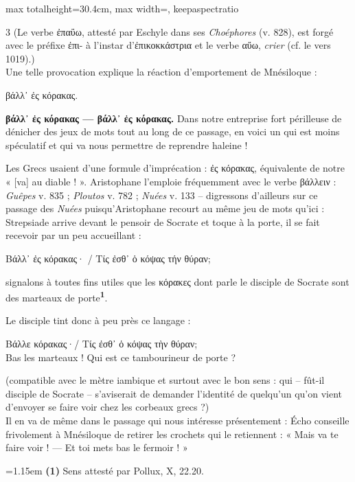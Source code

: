 \documentclass[11pt,twoside]{book}
\newcommand{\italique}[1]{\textit{#1}}
\newcommand{\citComm}[1]{\begin{quoting}[vskip=0.4pt,leftmargin=0.7em,rightmargin=0.2em]#1\end{quoting}}
\newcommand{\marqueur}[1]{\textsuperscript{\color{rubricRed}\textbf{#1}}}
\begin{document}
\begin{adjustbox}{max totalheight=30.4cm, max width=\textwidth, keepaspectratio}
\begin{minipage}{\textwidth}
{\begin{multicols}{3}
\noindent (Le verbe ἐπαΰω, attesté par Eschyle dans ses \italique{Choéphores} (v. 828), est forgé avec le préfixe ἐπι- à l'instar d'ἐπικοκκάστρια et le verbe αὔω, \italique{crier} (cf. le vers 1019).)\\ Une telle provocation explique la réaction d'emportement de Mnésiloque :
\citComm{βάλλ᾽ ἐς κόρακας.}
\par\vspace{1.5pt}
 \textbf{βάλλ᾽ ἐς κόρακας — βάλλ᾽ ἐς κόρακας.} Dans notre entreprise fort périlleuse de dénicher des jeux de mots tout au long de ce passage, en voici un qui est moins spéculatif et qui va nous permettre de reprendre haleine !
\par\vspace{1.5pt}
\noindent Les Grecs usaient d'une formule d'imprécation : ἐς κόρακας, équivalente de notre « [va] au diable ! ». Aristophane l'emploie fréquemment avec le verbe βάλλειν : \italique{Guêpes} v. 835 ; \italique{Ploutos} v. 782 ; \italique{Nuées} v. 133 – digressons d'ailleurs sur ce passage des \italique{Nuées} puisqu'Aristophane recourt au même jeu de mots qu'ici : Strepsiade arrive devant le pensoir de Socrate et toque à la porte, il se fait recevoir par un peu accueillant :
\citComm{Βάλλ᾽ ἐς κόρακας· / Τίς ἐσθ᾽ ὁ κόψας τήν θύραν;}
\par\vspace{1.5pt}
\noindent signalons à toutes fins utiles que les κόρακες dont parle le disciple de Socrate sont des marteaux de porte\marqueur{1}.
\par\vspace{1.5pt}
\noindent Le disciple tint donc à peu près ce langage :
\citComm{Βάλλε κόρακας·/ Τίς ἐσθ᾽ ὁ κόψας τὴν θύραν;\\
Bas les marteaux ! Qui est ce tambourineur de porte ?}
\par\vspace{1.5pt}
\noindent (compatible avec le mètre iambique et surtout avec le bon sens : qui – fût-il disciple de Socrate – s'aviserait de demander l'identité de quelqu'un qu'on vient d'envoyer se faire voir chez les corbeaux grecs ?)\\ Il en va de même dans le passage qui nous intéresse présentement : Écho conseille frivolement à Mnésiloque de retirer les crochets qui le retiennent : « Mais va te faire voir ! — Et toi mets bas le fermoir ! »
\par\vspace{1.5pt}
\par\vspace{1.2pt}\par\nopagebreak\vspace{1pt}\noindent\hangindent=1.15em {\color{sepiaNote}\textbf{(1)}} Sens attesté par Pollux, X, 22.20.

\end{multicols}}
\end{minipage}
\end{adjustbox}
\end{document}
